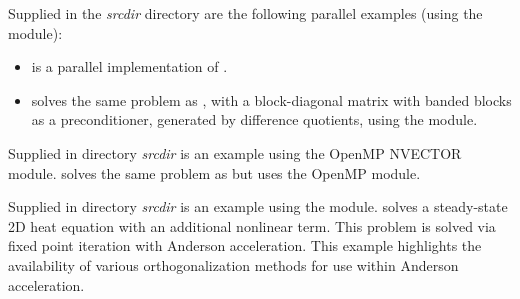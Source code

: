 \vspace{0.2in}\noindent
Supplied in the {\em srcdir} directory are
the following parallel examples (using the {\nvecp} module):
\begin{itemize}
\item {}
  is a parallel implementation of .
\item {}
  solves the same problem as , with a block-diagonal matrix
  with banded blocks as a preconditioner, generated by difference quotients,
  using the {\kinbbdpre} module.
\end{itemize}


\vspace{0.2in}\noindent
Supplied in directory {\em srcdir}
is an example using the OpenMP NVECTOR module.
 solves the same problem as
 but uses the OpenMP module.

\vspace{0.2in}\noindent
Supplied in directory {\em srcdir}
is an example using the {\nvecp} module.
 solves a steady-state 2D heat
equation with an additional nonlinear term.
This problem is solved via fixed point iteration with
Anderson acceleration. This example highlights the availability
of various orthogonalization methods for use within Anderson
acceleration.

